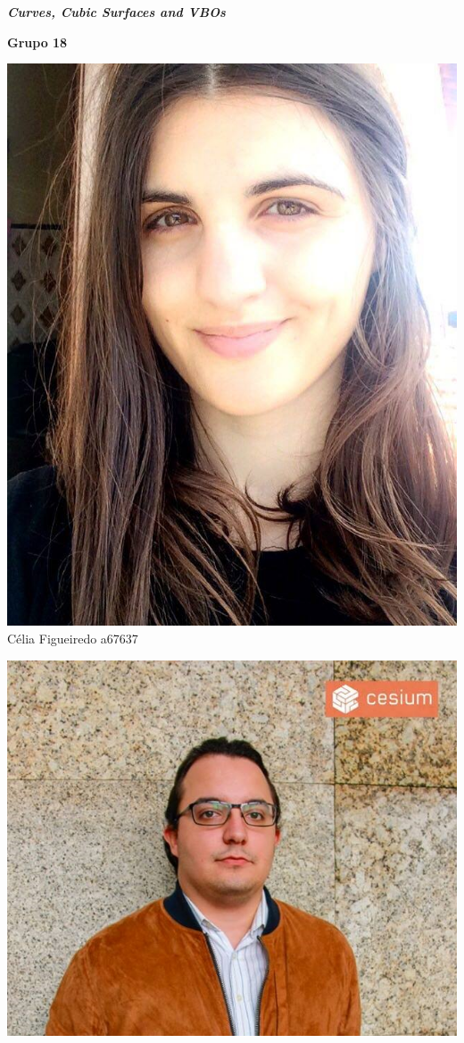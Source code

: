 \begin{titlepage}
\begin{center}
\Large \textbf{\textit{Curves, Cubic Surfaces and VBOs}}

\vspace{1.5cm}

{\Large \bfseries Grupo 18\\[2cm] }


\noindent\begin{minipage}[b]{.2\textwidth}
	\includegraphics[scale=0.18]{celia}
	\small{Célia Figueiredo a67637}
\end{minipage} 
\hfill
\begin{minipage}[b]{.2\textwidth}
	\includegraphics[scale=0.3]{luis}

\end{minipage}
\end{center}
\end{titlepage}
